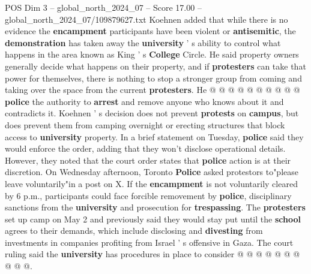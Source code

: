 \begin{textsample}{POS Dim 3 – global\_north\_2024\_07 – Score 17.00 – global\_north\_2024\_07/109879627.txt}
Koehnen added that while there is no evidence the \textbf{encampment} participants have been violent or \textbf{antisemitic}, the \textbf{demonstration} has taken away the \textbf{university} ' s ability to control what happens in the area known as King ' s \textbf{College} Circle.
He said property owners generally decide what happens on their property, and if \textbf{protesters} can take that power for themselves, there is nothing to stop a stronger group from coming and taking over the space from the current \textbf{protesters}.
He @ @ @ @ @ @ @ @ @ @ \textbf{police} the authority to \textbf{arrest} and remove anyone who knows about it and contradicts it.
Koehnen ' s decision does not prevent \textbf{protests} on \textbf{campus}, but does prevent them from camping overnight or erecting structures that block access to \textbf{university} property.
In a brief statement on Tuesday, \textbf{police} said they would enforce the order, adding that they won't disclose operational details.
However, they noted that the court order states that \textbf{police} action is at their discretion.
On Wednesday afternoon, Toronto \textbf{Police} asked protestors to"please leave voluntarily"in a post on X.
If the \textbf{encampment} is not voluntarily cleared by 6 p.m., participants could face forcible removement by \textbf{police}, disciplinary sanctions from the \textbf{university} and prosecution for \textbf{trespassing}.
The \textbf{protesters} set up camp on May 2 and previously said they would stay put until the \textbf{school} agrees to their demands, which include disclosing and \textbf{divesting} from investments in companies profiting from Israel ' s offensive in Gaza.
The court ruling said the \textbf{university} has procedures in place to consider @ @ @ @ @ @ @ @ @ @.

\end{textsample}
